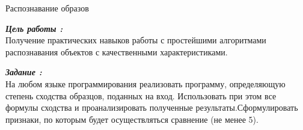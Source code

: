\documentclass[a4paper,12pt]{article}
\begin{document}
 	\begin{center}
 		\begin{Large}
 			Распознавание образов
 		\end{Large}
 	\end{center}
 	
 	\begin{flushleft}
 		\textit{\textbf{Цель работы :}}
 		\\
 		\medskip
 		\hangindent=1.5cm  \noindent
 		Получение практических навыков работы с простейшими алгоритмами 		распознавания объектов с качественными характеристиками.
 	\end{flushleft}
 		
	\begin{flushleft}
		\textit{\textbf{Задание :}}
		\\
		\medskip
		\hangindent=1.5cm  \noindent
		На любом языке программирования реализовать программу, определяющую  степень сходства образцов, поданных на вход. Использовать при этом все формулы сходства и проанализировать полученные результаты.Сформулировать признаки, по которым будет осуществляться сравнение (не менее 5).
	\end{flushleft}
	
\end{document}

